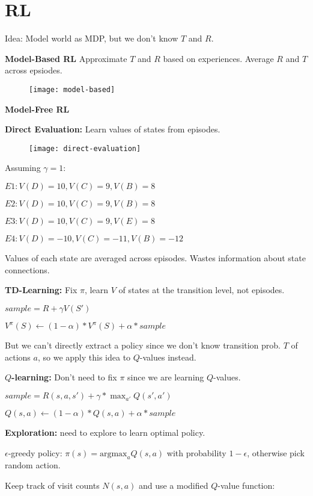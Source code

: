 \section{RL}
Idea: Model world as MDP, but we don't know $T$ and $R$.

\textbf{Model-Based RL}
Approximate $T$ and $R$ based on experiences. Average $R$ and $T$ across epsiodes.
\begin{figure}[H]
    \centering
    \texttt{[image: model-based]}
\end{figure}
\textbf{Model-Free RL}

\textbf{Direct Evaluation:} Learn values of states from episodes.
\begin{figure}[H]
    \centering
    \texttt{[image: direct-evaluation]}
\end{figure}


Assuming $\gamma = 1$:

$E1: V(D) = 10, V(C) = 9, V(B) = 8$

$E2: V(D) = 10, V(C) = 9, V(B) = 8$

$E3: V(D) = 10, V(C) = 9, V(E) = 8$

$E4: V(D) = -10, V(C) = -11, V(B) = -12$

Values of each state are averaged across episodes. Wastes information about state connections.

\textbf{TD-Learning:} Fix $\pi$, learn $V$ of states at the transition level, not episodes.

$sample = R + \gamma V(S')$

$V^{\pi}(S) \leftarrow (1 - \alpha) * V^{\pi}(S) + \alpha * sample$

But we can't directly extract a policy since we don't know transition prob. $T$ of actions $a$, so we apply this idea to $Q$-values instead.

\textbf{$Q$-learning:} Don't need to fix $\pi$ since we are learning $Q$-values.

$sample = R(s, a, s') + \gamma * \max_{a'} Q(s', a')$

$Q(s, a) \leftarrow (1 - \alpha) * Q(s, a) + \alpha * sample$

\textbf{Exploration:} need to explore to learn optimal policy.

$\epsilon$-greedy policy: $\pi(s) = \text{argmax}_a Q(s, a)$ with probability $1 - \epsilon$, otherwise pick random action.

Keep track of visit counts $N(s, a)$ and use a modified $Q$-value function:

